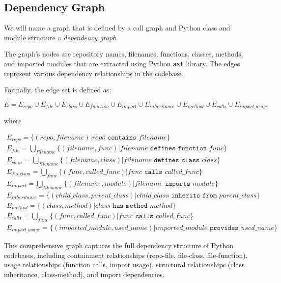 
\subsection{Dependency Graph}

We will name a graph that is defined by a call graph and Python class and module structure a \emph{dependency graph}.

The graph's nodes are repository names, filenames, functions, classes, methods, and imported modules that are extracted using Python \texttt{ast} library. The edges represent various dependency relationships in the codebase.

Formally, the edge set is defined as:

$$E = E_{repo} \cup E_{file} \cup E_{class} \cup E_{function} \cup E_{import} \cup E_{inheritance} \cup E_{method} \cup E_{calls} \cup E_{import\_usage}$$

where

\begin{gather*}
E_{repo} = \{(repo, filename) | repo \texttt{ contains } filename\} \\
E_{file} = \bigcup\limits_{filename} \{(filename, func) | filename \texttt{ defines function } func\} \\
E_{class} = \bigcup\limits_{filename} \{(filename, class) | filename \texttt{ defines class } class\} \\
E_{function} = \bigcup\limits_{func} \{(func, called\_func) | func \texttt{ calls } called\_func\} \\
E_{import} = \bigcup\limits_{filename} \{(filename, module) | filename \texttt{ imports } module\} \\
E_{inheritance} = \{(child\_class, parent\_class) | child\_class \texttt{ inherits from } parent\_class\} \\
E_{method} = \{(class, method) | class \texttt{ has method } method\} \\
E_{calls} = \bigcup\limits_{func} \{(func, called\_func) | func \texttt{ calls } called\_func\} \\
E_{import\_usage} = \{(imported\_module, used\_name) | imported\_module \texttt{ provides } used\_name\}
\end{gather*}

This comprehensive graph captures the full dependency structure of Python codebases, including containment relationships (repo-file, file-class, file-function), usage relationships (function calls, import usage), structural relationships (class inheritance, class-method), and import dependencies.
